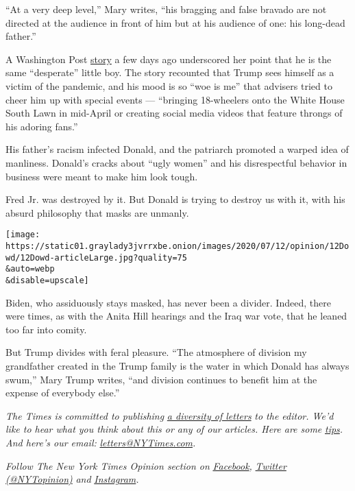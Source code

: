 ``At a very deep level,'' Mary writes, ``his bragging and false bravado
are not directed at the audience in front of him but at his audience of
one: his long-dead father.''

A Washington Post
\href{https://www.washingtonpost.com/politics/trump-the-victim-president-complains-in-private-about-the-pandemic-hurting-himself/2020/07/09/187142c6-c089-11ea-864a-0dd31b9d6917_story.html}{story}
a few days ago underscored her point that he is the same ``desperate''
little boy. The story recounted that Trump sees himself as a victim of
the pandemic, and his mood is so ``woe is me'' that advisers tried to
cheer him up with special events --- ``bringing 18-wheelers onto the
White House South Lawn in mid-April or creating social media videos that
feature throngs of his adoring fans.''

His father's racism infected Donald, and the patriarch promoted a warped
idea of manliness. Donald's cracks about ``ugly women'' and his
disrespectful behavior in business were meant to make him look tough.

Fred Jr. was destroyed by it. But Donald is trying to destroy us with
it, with his absurd philosophy that masks are unmanly.

\texttt{[image: https://static01.graylady3jvrrxbe.onion/images/2020/07/12/opinion/12Dowd/12Dowd-articleLarge.jpg?quality=75\\\&auto=webp\\\&disable=upscale]}

Biden, who assiduously stays masked, has never been a divider. Indeed,
there were times, as with the Anita Hill hearings and the Iraq war vote,
that he leaned too far into comity.

But Trump divides with feral pleasure. ``The atmosphere of division my
grandfather created in the Trump family is the water in which Donald has
always swum,'' Mary Trump writes, ``and division continues to benefit
him at the expense of everybody else.''

\emph{The Times is committed to publishing}
\href{https://www.nytimes3xbfgragh.onion/2019/01/31/opinion/letters/letters-to-editor-new-york-times-women.html}{\emph{a
diversity of letters}} \emph{to the editor. We'd like to hear what you
think about this or any of our articles. Here are some}
\href{https://help.nytimes3xbfgragh.onion/hc/en-us/articles/115014925288-How-to-submit-a-letter-to-the-editor}{\emph{tips}}\emph{.
And here's our email:}
\href{mailto:letters@NYTimes.com}{\emph{letters@NYTimes.com}}\emph{.}

\emph{Follow The New York Times Opinion section on}
\href{https://www.facebookcorewwwi.onion/nytopinion}{\emph{Facebook}}\emph{,}
\href{http://twitter.com/NYTOpinion}{\emph{Twitter (@NYTopinion)}}
\emph{and}
\href{https://www.instagram.com/nytopinion/}{\emph{Instagram}}\emph{.}

